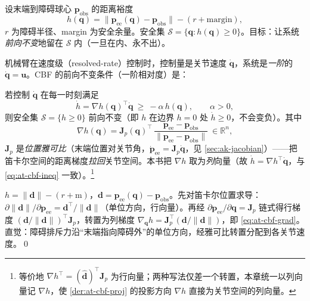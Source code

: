 \begin{definition}[安全函数与安全集]\label{def:at-cbf-h}
设末端到障碍球心 $\mathbf{p}_{\mathrm{obs}}$ 的距离裕度
\begin{equation}
  h(\mathbf{q})=\|\mathbf{p}_{\mathrm{ee}}(\mathbf{q})-\mathbf{p}_{\mathrm{obs}}\|-(r+\text{margin}),
  \label{eq:at-cbf-h}
\end{equation}
$r$ 为障碍半径、margin 为安全余量。安全集 $\mathcal{S}=\{\mathbf{q}:h(\mathbf{q})\ge 0\}$。目标：让系统\emph{前向不变}地留在 $\mathcal{S}$ 内（一旦在内、永不出）。
\end{definition}

机械臂在速度级（resolved-rate）控制时，控制量是关节速度 $\dot{\mathbf{q}}$，系统是\emph{一阶}的 $\dot{\mathbf{q}}=\mathbf{u}$。CBF 的前向不变条件（一阶相对度）是：

\begin{theorem}\label{thm:at-cbf-cond}
若控制 $\dot{\mathbf{q}}$ 在每一时刻满足
\begin{equation}
  \dot h=\nabla h(\mathbf{q})^\top\dot{\mathbf{q}}\ \ge\ -\alpha\,h(\mathbf{q}),\qquad \alpha>0,
  \label{eq:at-cbf-ineq}
\end{equation}
则安全集 $\mathcal{S}=\{h\ge 0\}$ 前向不变（即 $h$ 在边界 $h=0$ 处 $\dot h\ge 0$，不会变负）。其中
\begin{equation}
  \nabla h(\mathbf{q})=\mathbf{J}_p(\mathbf{q})^\top\,\frac{\mathbf{p}_{\mathrm{ee}}-\mathbf{p}_{\mathrm{obs}}}{\|\mathbf{p}_{\mathrm{ee}}-\mathbf{p}_{\mathrm{obs}}\|}\ \in\mathbb{R}^n,
  \label{eq:at-cbf-grad}
\end{equation}
$\mathbf{J}_p$ 是\emph{位置雅可比}（末端位置对关节角，$\dot{\mathbf{p}}_{\mathrm{ee}}=\mathbf{J}_p\dot{\mathbf{q}}$，见 \cref{sec:ak-jacobian}）——把笛卡尔空间的距离梯度\emph{拉回}关节空间。本书把 $\nabla h$ 取为\emph{列}向量（故 $\dot h=\nabla h^\top\dot{\mathbf{q}}$，与 \cref{eq:at-cbf-ineq} 一致）。\footnote{等价地 $\nabla h^\top=(\hat{\mathbf d})^\top\mathbf{J}_p$ 为行向量；两种写法仅差一个转置，本章统一以列向量记 $\nabla h$，使 \cref{der:at-cbf-proj} 的投影方向 $\nabla h$ 直接为关节空间的列向量。}
\end{theorem}

\begin{derivation}\label{der:at-cbf-grad}
$h=\|\mathbf{d}\|-(r+\text{m})$，$\mathbf{d}=\mathbf{p}_{\mathrm{ee}}(\mathbf{q})-\mathbf{p}_{\mathrm{obs}}$。先对笛卡尔位置求导：$\partial\|\mathbf{d}\|/\partial\mathbf{p}_{\mathrm{ee}}=\mathbf{d}^\top/\|\mathbf{d}\|$（单位方向，行向量）。再经 $\partial\mathbf{p}_{\mathrm{ee}}/\partial\mathbf{q}=\mathbf{J}_p$ 链式得行梯度 $(\mathbf{d}/\|\mathbf{d}\|)^\top\mathbf{J}_p$，转置为列梯度 $\nabla_{\mathbf{q}}h=\mathbf{J}_p^\top(\mathbf{d}/\|\mathbf{d}\|)$，即 \cref{eq:at-cbf-grad}。直觉：障碍排斥力沿“末端指向障碍外”的单位方向，经雅可比转置分配到各关节速度。\qed
\end{derivation}

